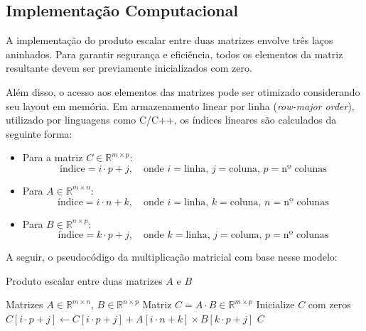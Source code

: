 \subsection{Implementação Computacional}

A implementação do produto escalar entre duas matrizes envolve três laços aninhados. Para garantir segurança e eficiência, todos os elementos da matriz resultante devem ser previamente inicializados com zero.

Além disso, o acesso aos elementos das matrizes pode ser otimizado considerando seu layout em memória. Em armazenamento linear por linha (\textit{row-major order}), utilizado por linguagens como C/C++, os índices lineares são calculados da seguinte forma:

\begin{itemize}
	\item Para a matriz \( C \in \mathbb{R}^{m \times p} \):
	      \[
		      \text{índice} = i \cdot p + j, \quad \text{onde } i = \text{linha}, \, j = \text{coluna}, \, p = \text{nº colunas}
	      \]
	\item Para \( A \in \mathbb{R}^{m \times n} \):
	      \[
		      \text{índice} = i \cdot n + k, \quad \text{onde } i = \text{linha}, \, k = \text{coluna}, \, n = \text{nº colunas}
	      \]
	\item Para \( B \in \mathbb{R}^{n \times p} \):
	      \[
		      \text{índice} = k \cdot p + j, \quad \text{onde } k = \text{linha}, \, j = \text{coluna}, \, p = \text{nº colunas}
	      \]
\end{itemize}

A seguir, o pseudocódigo da multiplicação matricial com base nesse modelo:

\begin{algorithm}[H]
	\caption{Produto escalar entre duas matrizes \( A \) e \( B \)}
	\begin{algorithmic}[1]
		\REQUIRE Matrizes \( A \in \mathbb{R}^{m \times n} \), \( B \in \mathbb{R}^{n \times p} \)
		\ENSURE Matriz \( C = A \cdot B \in \mathbb{R}^{m \times p} \)
		\STATE Inicialize \( C \) com zeros
		\STATE \( C[i \cdot p + j] \gets C[i \cdot p + j] + A[i \cdot n + k] \times B[k \cdot p + j] \)
		\ENDFOR
		\ENDFOR
		\ENDFOR
		\RETURN \( C \)
	\end{algorithmic}
\end{algorithm}

\printbibliography



